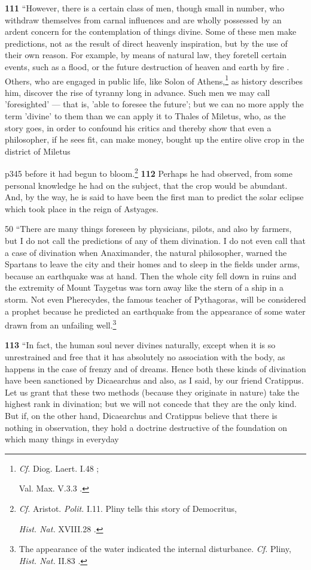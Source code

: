\textbf{111} ``However, there is a certain class of men, though small in number, who withdraw themselves from carnal influences and are wholly possessed by an ardent concern for the contemplation of things divine. Some of these men make predictions, not as the result of direct heavenly inspiration, but by the use of their own reason. For example, by means of natural law, they foretell certain events, such as a flood, or the future destruction of heaven and earth by fire . Others, who are engaged in public life, like Solon of Athens,\texthebrew{}\footnote{\emph{Cf.} Diog. Laert. I.48 ;

Val. Max. V.3.3 .

} as history describes him, discover the rise of tyranny long in advance. Such men we may call 'foresighted' \texthebrew{—} that is, 'able to foresee the future'; but we can no more apply the term 'divine' to them than we can apply it to Thales of Miletus, who, as the story goes, in order to confound his critics and thereby show that even a philosopher, if he sees fit, can make money, bought up the entire olive crop in the district of Miletus

p345 before it had begun to bloom.\texthebrew{}\footnote{\emph{Cf.} Aristot. \emph{Polit.} I.11. Pliny tells this story of Democritus,

\emph{Hist. Nat.} XVIII.28 .

} \textbf{112} Perhaps he had observed, from some personal knowledge he had on the subject, that the crop would be abundant. And, by the way, he is said to have been the first man to predict the solar eclipse which took place in the reign of Astyages.

50
``There are many things foreseen by physicians, pilots, and also by farmers, but I do not call the predictions of any of them divination. I do not even call that a case of divination when Anaximander, the natural philosopher, warned the Spartans to leave the city and their homes and to sleep in the fields under arms, because an earthquake was at hand. Then the whole city fell down in ruins and the extremity of Mount Taygetus was torn away like the stern of a ship in a storm. Not even Pherecydes, the famous teacher of Pythagoras, will be considered a prophet because he predicted an earthquake from the appearance of some water drawn from an unfailing well.\footnote{The appearance of the water indicated the internal disturbance. \emph{Cf.} Pliny, \emph{Hist. Nat.} II.83 .

}

\textbf{113} ``In fact, the human soul never divines naturally, except when it is so unrestrained and free that it has absolutely no association with the body, as happens in the case of frenzy and of dreams. Hence both these kinds of divination have been sanctioned by Dicaearchus and also, as I said, by our friend Cratippus. Let us grant that these two methods (because they originate in nature) take the highest rank in divination; but we will not concede that they are the only kind. But if, on the other hand, Dicaearchus and Cratippus believe that there is nothing in observation, they hold a doctrine destructive of the foundation on which many things in everyday

